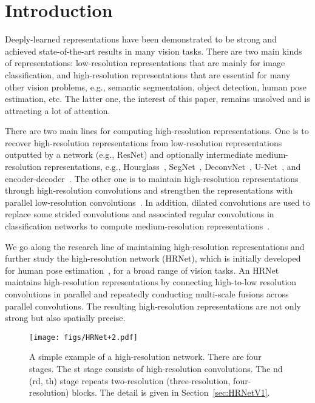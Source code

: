 \documentclass[10pt,twocolumn,letterpaper]{article}
\begin{document}
\section{Introduction}
Deeply-learned representations
have been demonstrated
to be strong and
achieved state-of-the-art results in many vision tasks.
There are two main kinds of representations:
low-resolution representations
that are mainly for image classification,
and high-resolution representations
that are essential for many other vision problems,
e.g., semantic segmentation,
object detection,
human pose estimation,
etc.
The latter one,
the interest of this paper,
remains unsolved and is attracting a lot of attention.


There are two main lines for
computing high-resolution representations.
One is to recover high-resolution representations from low-resolution representations outputted by a network
(e.g., ResNet)
and optionally intermediate medium-resolution representations,
e.g., Hourglass~\cite{NewellYD16},
SegNet~\cite{BadrinarayananK17},
DeconvNet~\cite{NohHH15},
U-Net~\cite{RonebergerFB15},
and encoder-decoder~\cite{PengFWM16}.
The other one is to maintain high-resolution representations
through high-resolution convolutions
and strengthen the representations
with parallel low-resolution convolutions~\cite{SunXLW19,FourureEFMT017,ZhouHZ15,SaxenaV16}.
In addition, dilated convolutions
are used to replace some strided convolutions
and associated regular convolutions
in classification networks
to compute medium-resolution representations~\cite{ChenPKMY18,ZhaoSQWJ17}.



We go along the research line
of maintaining high-resolution representations
and further study the high-resolution network (HRNet),
which is initially developed for human pose estimation~\cite{SunXLW19},
for a broad range of vision tasks.
An HRNet maintains high-resolution representations
by connecting high-to-low resolution convolutions in parallel
and repeatedly conducting multi-scale fusions across parallel convolutions.
The resulting high-resolution representations are not only strong
but also spatially precise.

\begin{figure*}[t]
\footnotesize
    \centering
    \texttt{[image: figs/HRNet+2.pdf]}
    \caption{A simple example
    of a high-resolution network.
    There are four stages.
    The st stage consists of high-resolution convolutions.
    The nd (rd, th) stage
    repeats two-resolution
    (three-resolution, four-resolution)
    blocks. The detail is given in Section~\ref{sec:HRNetV1}.}
    \label{fig:HRNet}
    \vspace{-2mm}
\end{figure*}
\end{document}
